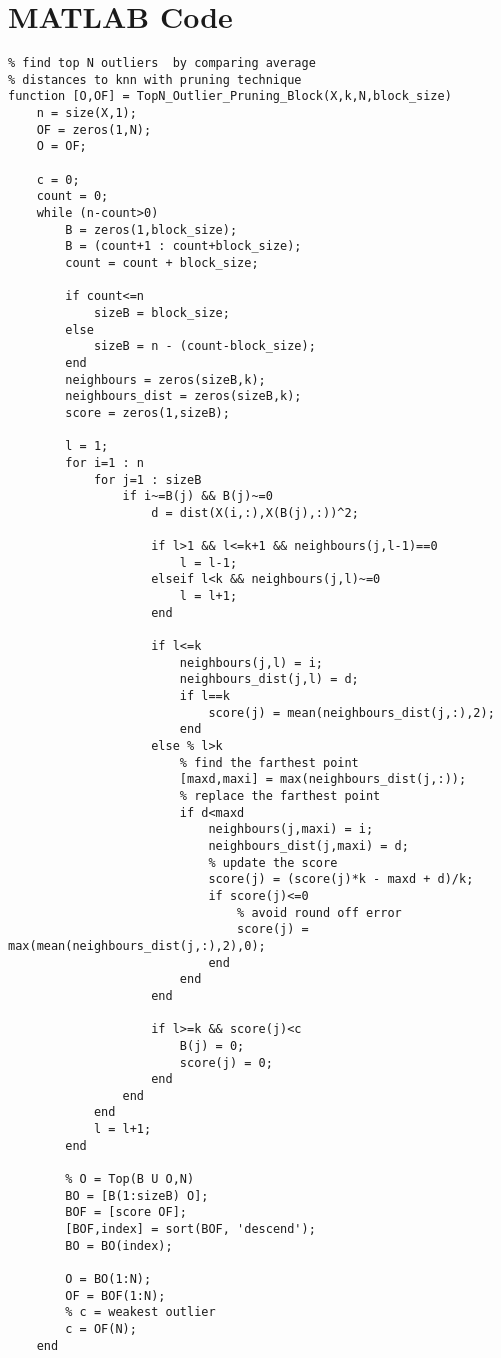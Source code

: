 \appendix

\chapter{MATLAB Code}
\label{apdx:matlabCode}
\lstset{language=Matlab}
\begin{lstlisting}
% find top N outliers  by comparing average 
% distances to knn with pruning technique
function [O,OF] = TopN_Outlier_Pruning_Block(X,k,N,block_size)
	n = size(X,1);
	OF = zeros(1,N);
	O = OF;

	c = 0;
	count = 0;
	while (n-count>0)
		B = zeros(1,block_size);
		B = (count+1 : count+block_size);
		count = count + block_size;        
		
		if count<=n
			sizeB = block_size;
		else
			sizeB = n - (count-block_size);
		end
		neighbours = zeros(sizeB,k);
		neighbours_dist = zeros(sizeB,k);
		score = zeros(1,sizeB);

		l = 1;
		for i=1 : n
			for j=1 : sizeB
				if i~=B(j) && B(j)~=0
					d = dist(X(i,:),X(B(j),:))^2;
		            
					if l>1 && l<=k+1 && neighbours(j,l-1)==0
						l = l-1;
					elseif l<k && neighbours(j,l)~=0
						l = l+1;
					end
		            
					if l<=k 
						neighbours(j,l) = i;   
						neighbours_dist(j,l) = d;
						if l==k
							score(j) = mean(neighbours_dist(j,:),2);
						end
					else % l>k
						% find the farthest point
						[maxd,maxi] = max(neighbours_dist(j,:));
						% replace the farthest point
						if d<maxd 
							neighbours(j,maxi) = i;
							neighbours_dist(j,maxi) = d;
							% update the score
							score(j) = (score(j)*k - maxd + d)/k;
							if score(j)<=0
								% avoid round off error
								score(j) = max(mean(neighbours_dist(j,:),2),0);
							end
						end                    
					end
		            
					if l>=k && score(j)<c
						B(j) = 0;                    
						score(j) = 0;                   
					end                                            
				end
			end
			l = l+1;
		end
		
		% O = Top(B U O,N)
		BO = [B(1:sizeB) O];
		BOF = [score OF];
		[BOF,index] = sort(BOF, 'descend');
		BO = BO(index);
		
		O = BO(1:N);
		OF = BOF(1:N);    
		% c = weakest outlier
		c = OF(N);
	end
\end{lstlisting}

